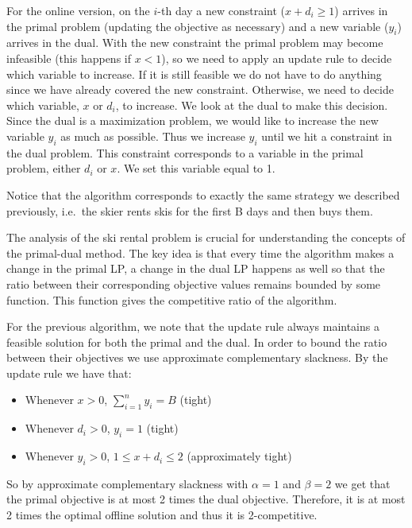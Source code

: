 For the online version, on the $i$-th day a new constraint ($x + d_i  \ge 1$) arrives in the primal problem (updating the objective as necessary) and a new variable ($y_i$) arrives in the dual.
With the new constraint the primal problem may become infeasible (this happens if $x < 1$), so we need to apply an update rule to decide which variable to increase.
If it is still feasible we do not have to do anything since we have already covered the new constraint. 
Otherwise, we need to decide which variable, $x$ or $d_i$, to increase. 
We look at the dual to make this decision. 
Since the dual is a maximization problem, we would like to increase the new variable $y_i$ as much as possible.
Thus we increase $y_i$ until we hit a constraint in the dual problem.
This constraint corresponds to a variable in the primal problem, either $d_i$ or $x$.
We set this variable equal to 1.

Notice that the algorithm corresponds to exactly the same strategy we described previously, i.e.\ the skier rents skis for the first B days and then buys them.


The analysis of the ski rental problem is crucial for understanding the concepts of the primal-dual method. 
The key idea is that every time the algorithm makes a change in the primal LP, a change in the dual LP happens as well so that the ratio between their corresponding objective values remains bounded by some function. 
This function gives the competitive ratio of the algorithm.

For the previous algorithm, we note that the update rule always maintains a feasible solution for both the primal and the dual. 
In order to bound the ratio between their objectives we use approximate complementary slackness. 
By the update rule we have that:
\begin{itemize}
\item Whenever $x > 0$, $\sum^n_{i=1} y_i = B$ (tight)
\item Whenever $d_i > 0$, $y_i = 1$ (tight)
\item Whenever $y_i > 0$, $1 \le x+d_i \le 2$ (approximately tight)
\end{itemize}

So by approximate complementary slackness with $\alpha = 1$ and $\beta = 2$ we get that the primal objective is at most 2 times the dual objective. Therefore, it is at most 2 times the optimal offline solution and thus it is 2-competitive.

